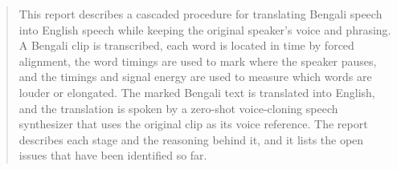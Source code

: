 \begin{abstract}
\noindent This report describes a cascaded procedure for translating Bengali speech into English speech while keeping the original speaker's voice and phrasing. A Bengali clip is transcribed, each word is located in time by forced alignment, the word timings are used to mark where the speaker pauses, and the timings and signal energy are used to measure which words are louder or elongated. The marked Bengali text is translated into English, and the translation is spoken by a zero-shot voice-cloning speech synthesizer that uses the original clip as its voice reference. The report describes each stage and the reasoning behind it, and it lists the open issues that have been identified so far.
\end{abstract}
